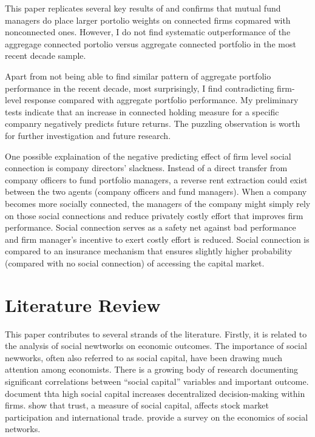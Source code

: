 \documentclass[11pt]{article}
\begin{document}
\begin{doublespace}
This paper replicates several key results of \cite{cohen2008small} and confirms that mutual fund managers do place larger portolio weights on connected firms copmared with nonconnected ones. However, I do not find systematic outperformance of the aggregage connected portolio versus aggregate connected portfolio in the most recent decade sample. 

Apart from not being able to find similar pattern of aggregate portfolio performance in the recent decade, most surprisingly, I find contradicting firm-level response compared with \cite{cohen2008small} aggregate portfolio performance. My preliminary tests indicate that an increase in connected holding measure for a specific companry negatively predicts future returns. The puzzling observation is worth for further investigation and future research. 

One possible explaination of the negative predicting effect of firm level social connection is company directors' slackness. Instead of a direct transfer from company officers to fund portfolio managers, a reverse rent extraction could exist between the two agents (company officers and fund managers). When a company becomes more socially connected, the managers of the company might simply rely on those social connections and reduce privately costly effort that improves firm performance. Social connection serves as a safety net against bad performance and firm manager's incentive to exert costly effort is reduced. Social connection is compared to an insurance mechanism that ensures slightly higher probability (compared with no social connection) of accessing the capital market. 


\section{Literature Review}
This paper contributes to several strands of the literature. Firstly, it is related to the analysis of social newtworks on economic outcomes. The importance of social newworks, often also referred to as social capital, have been drawing much attention among economists. There is a growing body of research documenting significant correlations between ``social capital'' variables and important outcome. \cite{bloom2012organization} document thta high social capital increases decentralized decision-making within firms. \cite{guiso2004role} show that trust, a measure of social capital, affects stock market participation and international trade. \cite{jackson2005economics} provide a survey on the economics of social networks. 


\end{doublespace}
\end{document}
